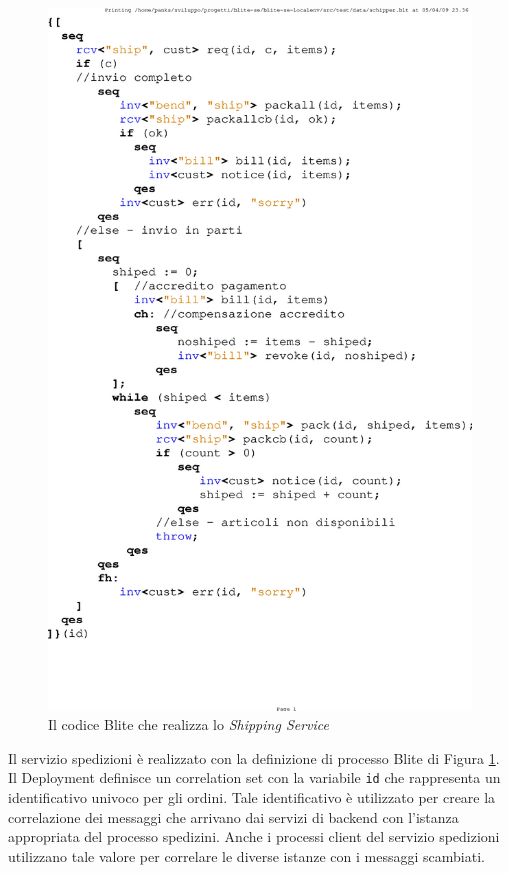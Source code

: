 \begin{figure}[tp]
\begin{center}
  \includegraphics[scale=0.80,clip]{blide/dia/shipper}
   \caption[Codice Blite, il Servizio Spedizioni]{Il codice Blite che realizza
   lo
   \emph{Shipping Service}}
  \label{fig:shipper}
\end{center}
\end{figure}

Il servizio spedizioni è realizzato con la definizione di processo Blite di
Figura \ref{fig:shipper}. Il Deployment definisce un correlation set con la
variabile \texttt{id} che rappresenta un identificativo univoco per gli ordini.
Tale identificativo è utilizzato per creare la correlazione dei messaggi che
arrivano dai servizi di backend con l'istanza appropriata del processo
spedizini. Anche i processi client del servizio spedizioni utilizzano tale valore per
correlare le diverse istanze con i messaggi scambiati.

